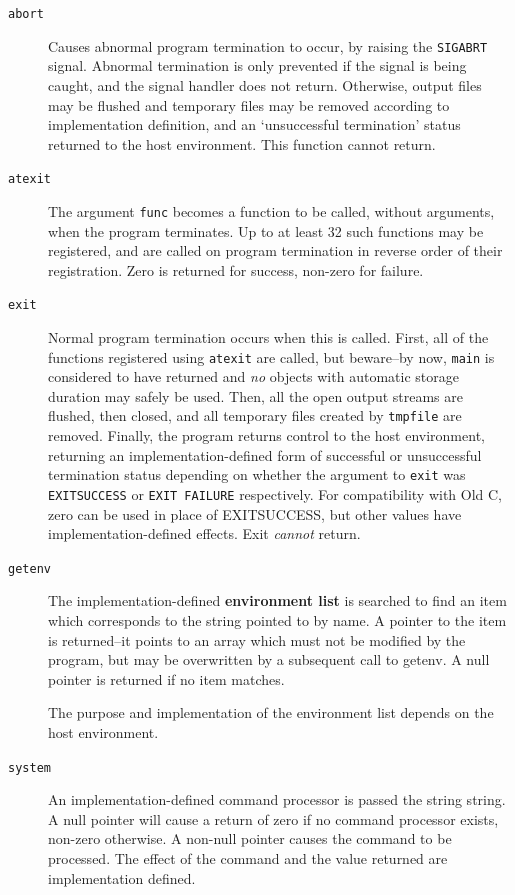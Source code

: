    \begin{description}
    \item[\texttt{abort}] Causes abnormal program termination to occur, by  raising
     the   \texttt{SIGABRT}   signal.   Abnormal  termination  is  only
     prevented if the signal is being caught, and  the  signal
     handler  does not return.  Otherwise, output files may be
     flushed and temporary files may be removed  according  to
     implementation    definition,    and   an   `unsuccessful
     termination' status returned  to  the  host  environment.
     This function cannot return.

    \item[\texttt{atexit}] The argument  \texttt{func}  becomes  a  function  to  be  called,
     without arguments, when the program terminates.  Up to at
     least 32 such functions may be registered, and are called
     on   program   termination  in  reverse  order  of  their
     registration.  Zero is returned for success, non-zero for
     failure.

    \item[\texttt{exit}] Normal program termination occurs when  this  is  called.
     First,  all  of the functions registered using \texttt{atexit} are
     called, but beware--by now, \texttt{main} is considered  to  have
     returned  and  \textit{no} objects with automatic storage duration
     may safely be used.  Then, all the  open  output  streams
     are flushed, then closed, and all temporary files created
     by \texttt{tmpfile} are removed.   Finally,  the  program  returns
     control   to   the   host   environment,   returning   an
     implementation-defined form of successful or unsuccessful
     termination status depending on whether the argument to \texttt{exit}
     was \texttt{EXITSUCCESS} or \texttt{EXIT FAILURE} respectively.
     For compatibility  with  Old C, zero can be used in place of
     EXITSUCCESS,  but  other  values  have
     implementation-defined effects.  Exit \textit{cannot} return.

    \item[\texttt{getenv}] 
     The implementation-defined \textbf{environment list}  is  searched
      to  find  an item which corresponds to the string pointed
      to by name.  A pointer to  the  item  is  returned--it
      points  to  an  array  which  must not be modified by the
      program, but may be overwritten by a subsequent  call  to
      getenv.  A null pointer is returned if no item matches.


     The purpose and implementation of  the  environment  list
      depends on the host environment.

    

    \item[\texttt{system}] An implementation-defined command processor is passed the
     string  string.   A  null  pointer will cause a return of
     zero if no command processor exists, non-zero  otherwise.
     A  non-null  pointer  causes the command to be processed.
     The effect of the command  and  the  value  returned  are
     implementation defined.
   \end{description}

